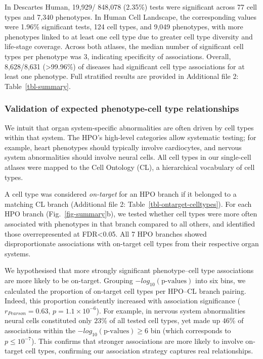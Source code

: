 \documentclass[
]{article}
\begin{document}
In Descartes Human, 19,929/ 848,078 (2.35\%) tests were significant
across 77 cell types and 7,340 phenotypes. In Human Cell Landscape, the
corresponding values were 1.96\% significant tests, 124 cell types, and
9,049 phenotypes, with more phenotypes linked to at least one cell type
due to greater cell type diversity and life-stage coverage. Across both
atlases, the median number of significant cell types per phenotype was
3, indicating specificity of associations. Overall, 8,628/8,631
(\textgreater99.96\%) of diseases had significant cell type associations
for at least one phenotype. Full stratified results are provided in
Additional file 2: Table~\ref{tbl-summary}.

\subsubsection{Validation of expected phenotype-cell type
relationships}\label{validation-of-expected-phenotype-cell-type-relationships-1}

We intuit that organ system-specific abnormalities are often driven by
cell types within that system. The HPO's high-level categories allow
systematic testing; for example, heart phenotypes should typically
involve cardiocytes, and nervous system abnormalities should involve
neural cells. All cell types in our single-cell atlases were mapped to
the Cell Ontology (CL), a hierarchical vocabulary of cell types.

A cell type was considered \emph{on-target} for an HPO branch if it
belonged to a matching CL branch (Additional file 2:
Table~\ref{tbl-ontarget-celltypes}). For each HPO branch
(Fig.~\ref{fig-summary}b), we tested whether cell types were more often
associated with phenotypes in that branch compared to all others, and
identified those overrepresented at FDR\textless0.05. All 7 HPO branches
showed disproportionate associations with on-target cell types from
their respective organ systems.

We hypothesised that more strongly significant phenotype--cell type
associations are more likely to be on-target. Grouping
\(-log_{10}(\text{p-values})\) into six bins, we calculated the
proportion of on-target cell types per HPO--CL branch pairing. Indeed,
this proportion consistently increased with association significance
(\(r_{Pearson}=\)\(0.63\), \(p=\)\(1.1 \times 10^{-6}\)). For example,
in nervous system abnormalities neural cells constituted only \(23\)\%
of all tested cell types, yet made up \(46\)\% of associations within
the \(-log_{10}(\text{p-values}) \ge 6\) bin (which corresponds to
\(p\le 10^{-7}\)). This confirms that stronger associations are more
likely to involve on-target cell types, confirming our association
strategy captures real relationships.
\end{document}
